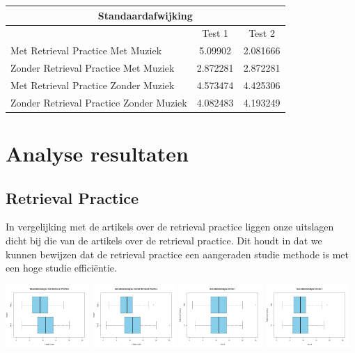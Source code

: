 \documentclass{hogent-article}
\begin{document}
	\begin{tabular}{ |p{10em}|c|c| }
	\hline
		\multicolumn{3}{|c|}{Standaardafwijking} \\
	\hline
		& Test 1 & Test 2 \\
	\hline
		Met Retrieval Practice Met Muziek  & 5.09902 & 2.081666 \\
	\hline
		Zonder Retrieval Practice Met Muziek & 2.872281 & 2.872281 \\
	\hline
		Met Retrieval Practice Zonder Muziek & 4.573474  & 4.425306 \\
	\hline
		Zonder Retrieval Practice Zonder Muziek & 4.082483 & 4.193249 \\
	\hline
	\end{tabular}
			
	\section{Analyse resultaten} %
	\subsection{Retrieval Practice} 
	In vergelijking met de artikels over de retrieval practice \autocite{butler2010repeated, pyc2012test, karpicke2007repeated, karpicke2008critical} liggen onze uitslagen dicht bij die van de artikels over de retrieval practice. Dit houdt in dat we kunnen bewijzen dat de retrieval practice een aangeraden studie methode is met een hoge studie efficiëntie.
	
	\includegraphics[width=120px]{Rplot_MetRetrievalPractice}
	\includegraphics[width=120px]{Rplot_ZonderRetrievalPractice}
	\includegraphics[width=120px]{Rplot_RetrievalPractice_Score1}
	\includegraphics[width=120px]{Rplot_RetrievalPractice_Score2}
	
\end{document}
